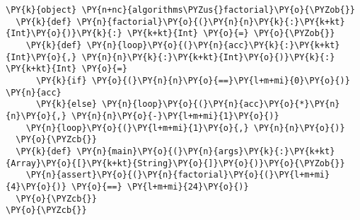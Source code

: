 \begin{Verbatim}[commandchars=\\\{\}]
\PY{k}{object} \PY{n+nc}{algorithms\PYZus{}factorial}\PY{o}{\PYZob{}}
  \PY{k}{def} \PY{n}{factorial}\PY{o}{(}\PY{n}{n}\PY{k}{:}\PY{k+kt}{Int}\PY{o}{)}\PY{k}{:} \PY{k+kt}{Int} \PY{o}{=} \PY{o}{\PYZob{}}
    \PY{k}{def} \PY{n}{loop}\PY{o}{(}\PY{n}{acc}\PY{k}{:}\PY{k+kt}{Int}\PY{o}{,} \PY{n}{n}\PY{k}{:}\PY{k+kt}{Int}\PY{o}{)}\PY{k}{:} \PY{k+kt}{Int} \PY{o}{=} 
      \PY{k}{if} \PY{o}{(}\PY{n}{n}\PY{o}{==}\PY{l+m+mi}{0}\PY{o}{)} \PY{n}{acc} 
      \PY{k}{else} \PY{n}{loop}\PY{o}{(}\PY{n}{acc}\PY{o}{*}\PY{n}{n}\PY{o}{,} \PY{n}{n}\PY{o}{-}\PY{l+m+mi}{1}\PY{o}{)}
    \PY{n}{loop}\PY{o}{(}\PY{l+m+mi}{1}\PY{o}{,} \PY{n}{n}\PY{o}{)} 
  \PY{o}{\PYZcb{}}
  \PY{k}{def} \PY{n}{main}\PY{o}{(}\PY{n}{args}\PY{k}{:}\PY{k+kt}{Array}\PY{o}{[}\PY{k+kt}{String}\PY{o}{]}\PY{o}{)}\PY{o}{\PYZob{}}
    \PY{n}{assert}\PY{o}{(}\PY{n}{factorial}\PY{o}{(}\PY{l+m+mi}{4}\PY{o}{)} \PY{o}{==} \PY{l+m+mi}{24}\PY{o}{)}
  \PY{o}{\PYZcb{}} 
\PY{o}{\PYZcb{}}
\end{Verbatim}
